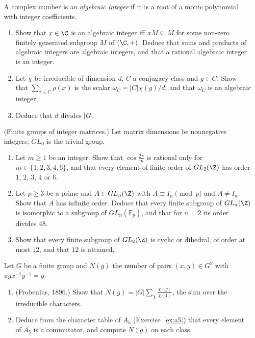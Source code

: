 \begin{exercise}[$\star\star\star$]\label{ex:divides}
A complex number is an \emph{algebraic integer} if it is a root of a monic polynomial with integer coefficients.
\begin{enumerate}[label=(\alph*)]
\item Show that $x\in\C$ is an algebraic integer iff $xM\subseteq M$ for some non-zero finitely generated subgroup $M$ of $(\C,+)$. Deduce that sums and products of algebraic integers are algebraic integers, and that a rational algebraic integer is an integer.
\item Let $\chi$ be irreducible of dimension $d$, $C$ a conjugacy class and $g\in C$. Show that $\sum_{x\in C}\rho(x)$ is the scalar $\omega_C=|C|\chi(g)/d$, and that $\omega_C$ is an algebraic integer.
\item Deduce that $d$ divides $|G|$.
\end{enumerate}
\end{exercise}

\begin{exercise}[$\star\star\star$]\label{pb:glnz}
(Finite groups of integer matrices.) Let matrix dimensions be nonnegative integers; $GL_0$ is the trivial group.
\begin{enumerate}[label=(\alph*)]
\item Let $m\ge1$ be an integer. Show that $\cos\frac{2\pi}m$ is rational only for $m\in\{1,2,3,4,6\}$, and that every element of finite order of
$GL_2(\Z)$ has order $1$, $2$, $3$, $4$ or $6$.
\item Let $p\ge3$ be a prime and $A\in GL_n(\Z)$ with $A\equiv I_n\pmod p$ and $A\ne I_n$. Show that $A$ has infinite order.
Deduce that every finite subgroup of $GL_n(\Z)$ is isomorphic to a subgroup of $GL_n(\mathbb F_p)$, and that for $n=2$ its
order divides $48$.
\item Show that every finite subgroup of $GL_2(\Z)$ is cyclic or dihedral, of order at most $12$, and that $12$ is attained.
\end{enumerate}
\end{exercise}

\begin{exercise}[$\star\star$]\label{pb:commutators}
Let $G$ be a finite group and $N(g)$ the number of pairs $(x,y)\in G^2$ with $xyx^{-1}y^{-1}=g$.
\begin{enumerate}[label=(\alph*)]
\item (Frobenius, 1896.) Show that $N(g)=|G|\sum_\chi\frac{\chi(g)}{\chi(1)}$, the sum over the irreducible characters.
\item Deduce from the character table of $A_5$ (Exercise~\ref{ex:a5}) that every element of $A_5$ is a commutator,
and compute $N(g)$ on each class.
\end{enumerate}
\end{exercise}

